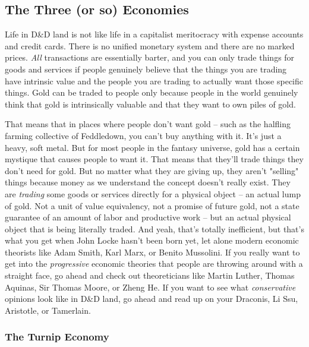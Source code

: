 \subsection{The Three (or so) Economies}
\vspace*{-8pt}

Life in D\&D land is not like life in a capitalist meritocracy with expense accounts and credit cards. There is no unified monetary system and there are no marked prices. \textit{All} transactions are essentially barter, and you can only trade things for goods and services if people genuinely believe that the things you are trading have intrinsic value and the people you are trading to actually want those specific things. Gold can be traded to people only because people in the world genuinely think that gold is intrinsically valuable and that they want to own piles of gold.

That means that in places where people don't want gold -- such as the halfling farming collective of Feddledown, you can't buy anything with it. It's just a heavy, soft metal. But for most people in the fantasy universe, gold has a certain mystique that causes people to want it. That means that they'll trade things they don't need for gold. But no matter what they are giving up, they aren't "selling" things because money as we understand the concept doesn't really exist. They are \textit{trading} some goods or services directly for a physical object -- an actual lump of gold. Not a unit of value equivalency, not a promise of future gold, not a state guarantee of an amount of labor and productive work -- but an actual physical object that is being literally traded. And yeah, that's totally inefficient, but that's what you get when John Locke hasn't been born yet, let alone modern economic theorists like Adam Smith, Karl Marx, or Benito Mussolini. If you really want to get into the \textit{progressive} economic theories that people are throwing around with a straight face, go ahead and check out theoreticians like Martin Luther, Thomas Aquinas, Sir Thomas Moore, or Zheng He. If you want to see what \textit{conservative} opinions look like in D\&D land, go ahead and read up on your Draconis, Li Ssu, Aristotle, or Tamerlain.

\subsubsection{The Turnip Economy}
\vspace*{-8pt}

